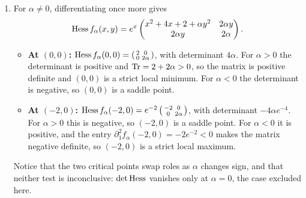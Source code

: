 \begin{exercisesolution}
\begin{enumerate}[label=\textbf{(\alph*)}]
  \item For $\alpha \neq 0$, differentiating once more gives
\[\operatorname{Hess} f_\alpha(x,y) = e^x \begin{pmatrix} x^2+4x+2+\alpha y^2 & 2\alpha y \\ 2\alpha y & 2\alpha \end{pmatrix}.\]
\begin{itemize}
  \item \textbf{At $(0,0)$:} $\operatorname{Hess} f_\alpha(0,0) = \left(\begin{smallmatrix} 2 & 0 \\ 0 & 2\alpha \end{smallmatrix}\right)$, with determinant $4\alpha$. For $\alpha > 0$ the determinant is positive and $\operatorname{Tr} = 2+2\alpha > 0$, so the matrix is positive definite and $(0,0)$ is a strict local minimum. For $\alpha < 0$ the determinant is negative, so $(0,0)$ is a saddle point.
  \item \textbf{At $(-2,0)$:} $\operatorname{Hess} f_\alpha(-2,0) = e^{-2}\left(\begin{smallmatrix} -2 & 0 \\ 0 & 2\alpha \end{smallmatrix}\right)$, with determinant $-4\alpha e^{-4}$. For $\alpha > 0$ this is negative, so $(-2,0)$ is a saddle point. For $\alpha < 0$ it is positive, and the entry $\partial_1^2 f_\alpha(-2,0) = -2e^{-2} < 0$ makes the matrix negative definite, so $(-2,0)$ is a strict local maximum.
\end{itemize}
Notice that the two critical points swap roles as $\alpha$ changes sign, and that neither test is
inconclusive: $\det \operatorname{Hess}$ vanishes only at $\alpha = 0$, the case excluded here.


\end{enumerate}
\end{exercisesolution}
